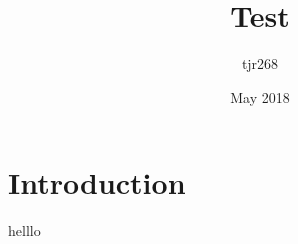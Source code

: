 \documentclass{article}
\title{Test}
\author{tjr268 }
\date{May 2018}
\begin{document}
\maketitle

\section{Introduction}

helllo
\end{document}
